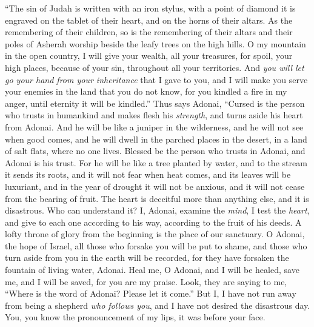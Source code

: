 \begin{biblechapter} %
 “The sin of Judah is written with an iron stylus, 
with a point of diamond it is engraved 
on the tablet of their heart, 
and on the horns of their altars.
\verse As the remembering of their children, 
so is the remembering of their altars 
and their poles of Asherah worship 
beside the leafy trees on the high hills.
\verse O my mountain in the open country, 
I will give your wealth, all your treasures, for spoil, 
your high places, because of your sin, 
throughout all your territories.
\verse And \textit{you will let go your hand from your inheritance} 
that I gave to you, 
and I will make you serve your enemies 
in the land that you do not know, 
for you kindled a fire in my anger, 
until eternity it will be kindled.”
 Thus says Adonai,
\verse “Cursed is the person who trusts in humankind 
and makes flesh his \textit{strength}, 
and turns aside his heart from Adonai.
\verse And he will be like a juniper in the wilderness, 
and he will not see when good comes, 
and he will dwell in the parched places in the desert, 
in a land of salt flats, where no one lives.
\verse Blessed be the person who trusts in Adonai, 
and Adonai is his trust.
\verse For he will be like a tree planted by water, 
and to the stream it sends its roots, 
and it will not fear when heat comes, 
and its leaves will be luxuriant, 
and in the year of drought it will not be anxious, 
and it will not cease from the bearing of fruit.
\verse The heart is deceitful more than anything else, 
and it is disastrous. Who can understand it?
\verse I, Adonai, examine the \textit{mind}, 
I test the \textit{heart}, 
and give to each one according to his way, 
according to the fruit of his deeds.
 A lofty throne of glory from the beginning 
is the place of our sanctuary.
\verse O Adonai, the hope of Israel, 
all those who forsake you will be put to shame, 
and those who turn aside from you in the earth will be recorded, 
for they have forsaken the fountain of living water, Adonai.
\verse Heal me, O Adonai, and I will be healed, 
save me, and I will be saved, 
for you are my praise.
\verse Look, they are saying to me, 
“Where is the word of Adonai? 
Please let it come.”
\verse But I, I have not run away from being a shepherd \textit{who follows you}, 
and I have not desired the disastrous day. 
You, you know the pronouncement of my lips, 
it was before your face.

\end{biblechapter}
